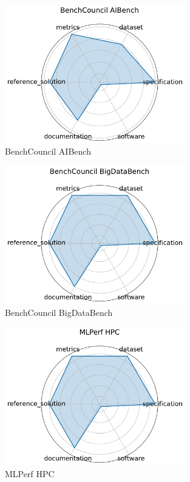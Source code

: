 \documentclass{article}
\begin{document}
\begin{figure}[h!]
  \centering
  \includegraphics[width=0.7\textwidth]{BenchCouncil AIBench_radar.pdf}
  \caption{BenchCouncil AIBench \cite{gao2019aibenchindustrystandardinternet}}
\end{figure}

\begin{figure}[h!]
  \centering
  \includegraphics[width=0.7\textwidth]{BenchCouncil BigDataBench_radar.pdf}
  \caption{BenchCouncil BigDataBench \cite{gao2018bigdatabenchscalableunifiedbig}}
\end{figure}

\begin{figure}[h!]
  \centering
  \includegraphics[width=0.7\textwidth]{MLPerf HPC_radar.pdf}
  \caption{MLPerf HPC \cite{farrell2021mlperfhpcholisticbenchmark}}
\end{figure}
\end{document}
